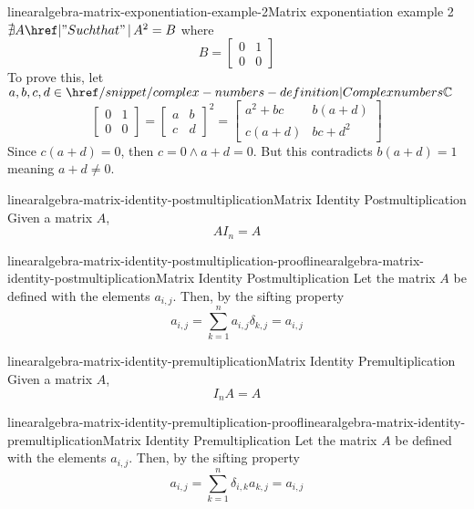 \documentclass[preview]{standalone}
\begin{document}
\begin{snippetexample}{linearalgebra-matrix-exponentiation-example-2}{Matrix exponentiation example 2}
    \(\nexists A \suchthat A^2 = B\) where
    \[
        B = \begin{bmatrix}
            0 & 1 \\
            0 & 0
        \end{bmatrix}
    \]
    To prove this, let \(a,b,c,d \in \complexnumbers\)
    \[
        \begin{bmatrix}
            0 & 1 \\
            0 & 0
        \end{bmatrix}
        =
        {\begin{bmatrix}
            a & b \\
            c & d
        \end{bmatrix}}^2
        =
        \begin{bmatrix}
            a^2+bc & b(a+d) \\
            c(a+d) & bc+d^2
        \end{bmatrix}
    \]
    Since \(c(a+d)=0\), then \(c=0 \land a+d=0\).
    But this contradicts \(b(a+d)=1\) meaning \(a+d \neq 0\).
\end{snippetexample}

\begin{snippetproposition}{linearalgebra-matrix-identity-postmultiplication}{Matrix Identity Postmultiplication}
    Given a matrix \(A\),
    \[ AI_n=A \]
\end{snippetproposition}

\begin{snippetproof}{linearalgebra-matrix-identity-postmultiplication-proof}{linearalgebra-matrix-identity-postmultiplication}{Matrix Identity Postmultiplication}
    Let the matrix \(A\) be defined with the
    elements \(a_{i,j}\).
    Then, by the sifting property %
    \[
        a_{i,j} = \sum_{k=1}^n
        a_{i,j}\delta_{k,j} = a_{i,j}
    \]
\end{snippetproof}

\begin{snippetproposition}{linearalgebra-matrix-identity-premultiplication}{Matrix Identity Premultiplication}
    Given a matrix \(A\),
    \[ I_n A=A \]
\end{snippetproposition}

\begin{snippetproof}{linearalgebra-matrix-identity-premultiplication-proof}{linearalgebra-matrix-identity-premultiplication}{Matrix Identity Premultiplication}
    Let the matrix \(A\) be defined with the
    elements \(a_{i,j}\).
    Then, by the sifting property %
    \[
        a_{i,j} = \sum_{k=1}^n
        \delta_{i,k}a_{k,j} = a_{i,j}
    \]
\end{snippetproof}
\end{document}
